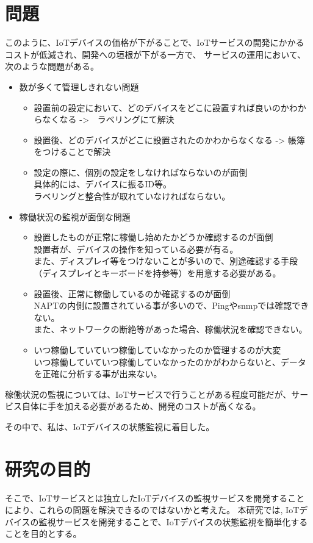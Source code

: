 \section{問題}
このように、IoTデバイスの価格が下がることで、IoTサービスの開発にかかるコストが低減され、開発への垣根が下がる一方で、
サービスの運用において、次のような問題がある。
\begin{itemize}
	\item 数が多くて管理しきれない問題
	\begin{itemize}
		\item 設置前の設定において、どのデバイスをどこに設置すれば良いのかわからなくなる ->　ラベリングにて解決
		\item 設置後、どのデバイスがどこに設置されたのかわからなくなる -> 帳簿をつけることで解決
		\item 設定の際に、個別の設定をしなければならないのが面倒\\
			具体的には、デバイスに振るID等。\\
			ラベリングと整合性が取れていなければならない。
	\end{itemize}
	\item 稼働状況の監視が面倒な問題
	\begin{itemize}
		\item 設置したものが正常に稼働し始めたかどうか確認するのが面倒\\
			設置者が、デバイスの操作を知っている必要が有る。\\
			また、ディスプレイ等をつけないことが多いので、別途確認する手段（ディスプレイとキーボードを持参等）を用意する必要がある。
		\item 設置後、正常に稼働しているのか確認するのが面倒\\
			NAPTの内側に設置されている事が多いので、Pingやsnmpでは確認できない。\\
			また、ネットワークの断絶等があった場合、稼働状況を確認できない。
		\item いつ稼働していていつ稼働していなかったのか管理するのが大変\\
			いつ稼働していていつ稼働していなかったのかがわからないと、データを正確に分析する事が出来ない。
	\end{itemize}
\end{itemize}

稼働状況の監視については、IoTサービスで行うことがある程度可能だが、サービス自体に手を加える必要があるため、開発のコストが高くなる。

その中で、私は、IoTデバイスの状態監視に着目した。

\section{研究の目的}
そこで、IoTサービスとは独立したIoTデバイスの監視サービスを開発することにより、これらの問題を解決できるのではないかと考えた。
本研究では, IoTデバイスの監視サービスを開発することで、IoTデバイスの状態監視を簡単化することを目的とする。

